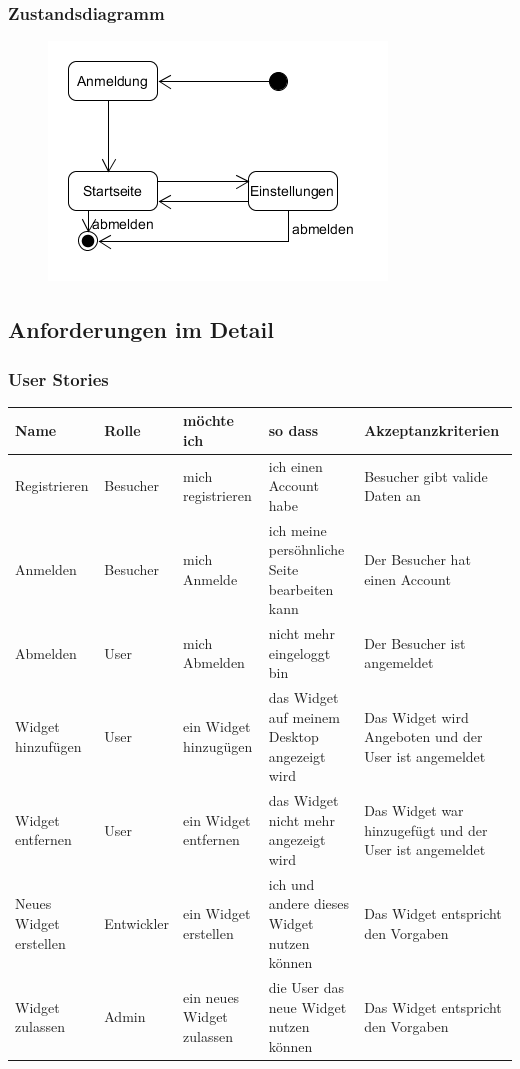 		\subsubsection{Zustandsdiagramm}
			\begin{figure}[H]
				\includegraphics[scale=1]{images/zustand}
			\end{figure}
	
	\subsection{Anforderungen im Detail}
	
		\subsubsection{User Stories}
		
			\begin{center}
				\begin{tabular}{ | p{2cm} | p{2cm} | p{3cm} | p{3cm} | p{4cm} |}
					\hline
					\textbf{Name} & \textbf{Rolle} & \textbf{möchte ich} & \textbf{so dass} & \textbf{Akzeptanzkriterien}\\ \hline
					Registrieren & Besucher & mich registrieren & ich einen Account habe & Besucher gibt valide Daten an \\  \hline
					Anmelden & Besucher & mich Anmelde & ich meine persöhnliche \newline Seite bearbeiten kann & Der Besucher hat einen Account \\  \hline
					Abmelden & User & mich Abmelden & nicht mehr eingeloggt bin & Der Besucher ist angemeldet \\ \hline
					Widget hinzufügen & User & ein Widget hinzugügen & das Widget auf meinem Desktop angezeigt wird & Das Widget wird Angeboten und der User ist angemeldet \\ \hline
					Widget entfernen & User & ein Widget entfernen & das Widget nicht mehr angezeigt wird & Das Widget war hinzugefügt und der User ist angemeldet \\ \hline
					Neues Widget erstellen & Entwickler & ein Widget erstellen & ich und andere dieses Widget nutzen können & Das Widget entspricht den Vorgaben \\ \hline
					Widget zulassen & Admin & ein neues Widget zulassen & die User das neue Widget nutzen können & Das Widget entspricht den Vorgaben \\				
					\hline
				\end{tabular}
			\end{center}

